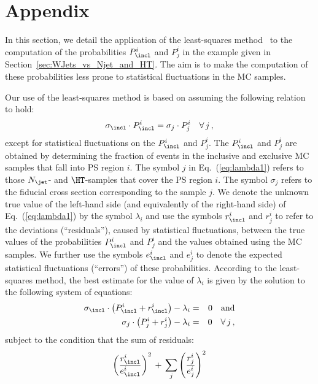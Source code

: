 \section{Appendix}
\label{sec:appendix}

In this section, we detail the application of the least-squares method~\cite{Cowan:1998ji}
to the computation of the probabilities $P_{\incl}^{i}$ and $P_{j}^{i}$
in the example given in Section~\ref{sec:WJets_vs_Njet_and_HT}.
The aim is to make the computation of these probabilities less prone to statistical fluctuations in the MC samples.

Our use of the least-squares method is based on assuming the following relation to hold:
\begin{equation}
\sigma_{\incl} \cdot P_{\incl}^{i} = \sigma_{j} \cdot P_{j}^{i} \quad \forall \, j \, ,
\label{eq:lambda1}
\end{equation}
except for statistical fluctuations on the $P_{\incl}^{i}$ and $P_{j}^{i}$.
The $P_{\incl}^{i}$ and $P_{j}^{i}$ are obtained by determining the fraction of events in the inclusive and exclusive MC samples that fall into PS region $i$.
The symbol $j$ in Eq.~(\ref{eq:lambda1}) refers to those $N_{\jet}$- and $\HT$-samples that cover the PS region $i$.
The symbol $\sigma_{j}$ refers to the fiducial cross section corresponding to the sample $j$.
We denote the unknown true value of the left-hand side (and equivalently of the right-hand side) of Eq.~(\ref{eq:lambda1}) by the symbol $\lambda_{i}$
and use the symbols $r_{\incl}^{i}$ and $r_{j}^{i}$ to refer to the deviations (``residuals''), caused by statistical fluctuations,
between the true values of the probabilities $P_{\incl}^{i}$ and $P_{j}^{i}$ and the values obtained using the MC samples.
We further use the symbols $e_{\incl}^{i}$ and $e_{j}^{i}$ to denote the expected statistical fluctuations (``errors'') of these probabilities.
According to the least-squares method,
the best estimate for the value of $\lambda_{i}$ is given by the solution to the following system of equations:
\begin{eqnarray*}
\sigma_{\incl} \cdot \left( P_{\incl}^{i} + r_{\incl}^{i} \right) - \lambda_{i} & = & 0 \quad \mbox{and} \\
\sigma_{j} \cdot \left( P_{j}^{i} + r_{j}^{i} \right) - \lambda_{i} & = & 0 \quad \forall \, j \, ,
\end{eqnarray*}
subject to the condition that the sum of residuals:
\begin{equation*}
\left( \frac{r_{\incl}^{i}}{e_{\incl}^{i}} \right)^{2} \, + \, \sum_{j} \left( \frac{r_{j}^{i}}{e_{j}^{i}} \right)^{2}
\end{equation*}
